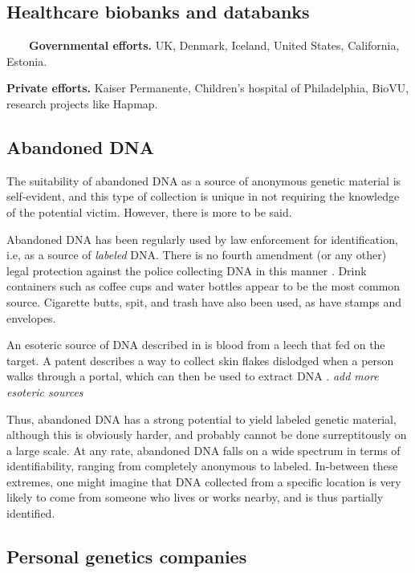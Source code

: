 \documentclass{article}
\begin{document}
\subsection{Healthcare biobanks and databanks}

\ \ \ \ {\bf Governmental efforts.} UK, Denmark, Iceland, United States, California, Estonia.

{\bf Private efforts.} Kaiser Permanente, Children's hospital of Philadelphia, BioVU, research projects like Hapmap.

\subsection{Abandoned DNA}

The suitability of abandoned DNA as a source of anonymous genetic material is self-evident, and this type of collection is unique in not requiring the knowledge of the potential victim.  However, there is more to be said.  

Abandoned DNA has been regularly used by law enforcement for identification, i.e, as a source of {\em labeled} DNA.  There is no fourth amendment (or any other) legal protection against the police collecting DNA in this manner \cite{joh, 4th-survey}.  Drink containers such as coffee cups and water bottles appear to be the most common source. Cigarette butts, spit, and trash have also been used, as have stamps and envelopes. 

An esoteric source of DNA described in \cite{leech} is blood from a leech that fed on the target. A patent describes a way to collect skin flakes dislodged when a person walks through a portal, which can then be used to extract DNA \cite{skin-patent}. {\em add more esoteric sources}

Thus, abandoned DNA has a strong potential to yield labeled genetic material, although this is obviously harder, and probably cannot be done surreptitously on a large scale. At any rate, abandoned DNA falls on a wide spectrum in terms of identifiability, ranging from completely anonymous to labeled.  In-between these extremes, one might imagine that DNA collected from a specific location is very likely to come from someone who lives or works nearby, and is thus partially identified.



\subsection{Personal genetics companies}
\end{document}

